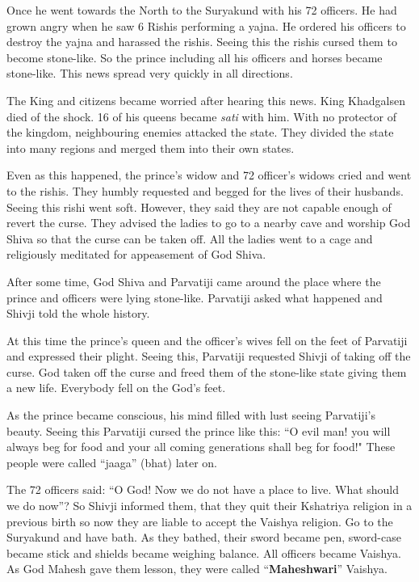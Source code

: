 Once he went towards the North to the Suryakund with his 72 officers. He had grown angry when he saw 6 Rishis performing a yajna. He ordered his officers to destroy the yajna and harassed the rishis. Seeing this the rishis cursed them to become stone-like. So the prince including all his officers and horses became stone-like. This news spread very quickly in all directions.

The King and citizens became worried after hearing this news. King Khadgalsen died of the shock. 16 of his queens became \textit{sati} with him. With no protector of the kingdom, neighbouring enemies attacked the state. They divided the state into many regions and merged them into their own states.

Even as this happened, the prince's widow and 72 officer's widows cried and went to the rishis. They humbly requested and begged for the lives of their husbands. Seeing this rishi went soft. However, they said they are not capable enough of revert the curse. They advised the ladies to go to a nearby cave and worship God Shiva so that the curse can be taken off. All the ladies went to a cage and religiously meditated for appeasement of God Shiva.

After some time, God Shiva and Parvatiji came around the place where the prince and officers were lying stone-like. Parvatiji asked what happened and Shivji told the whole history.

At this time the prince's queen and the officer's wives fell on the feet of Parvatiji and expressed their plight. Seeing this, Parvatiji requested Shivji of taking off the curse. God taken off the curse and freed them of the stone-like state giving them a new life. Everybody fell on the God's feet.

As the prince became conscious, his mind filled with lust seeing Parvatiji's beauty. Seeing this Parvatiji cursed the prince like this: ``O evil man! you will always beg for food and your all coming generations shall beg for food!" These people were called ``jaaga'' (bhat) later on.

The 72 officers said: ``O God! Now we do not have a place to live. What should we do now''? So Shivji informed them, that they quit their Kshatriya religion in a previous birth so now they are liable to accept the Vaishya religion. Go to the Suryakund and have bath. As they bathed, their sword became pen, sword-case became stick and shields became weighing balance. All officers became Vaishya. As God Mahesh gave them lesson, they were called ``\textbf{Maheshwari}'' Vaishya.

